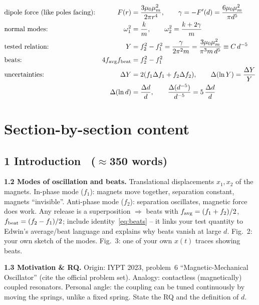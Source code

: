 \documentclass[11pt,a4paper]{article}
\newcommand{\Y}{Y}                       %
\newcommand{\muz}{\mu_0}
\newcommand{\mum}{\mu_m}
\newcommand{\words}[1]{~{\small\color{gray}($\approx$#1 words)}}
\begin{document}
\begin{keybox}
\begin{align}
&\text{dipole force (like poles facing):} & F(r)&=\frac{3\muz\mum^2}{2\pi r^4}, \qquad
  \gamma=-F'(d)=\frac{6\muz\mum^2}{\pi d^5} \label{eq:F}\\
&\text{normal modes:} & \omega_1^2&=\frac{k}{m},\qquad \omega_2^2=\frac{k+2\gamma}{m} \label{eq:modes}\\
&\text{tested relation:} & \Y&=f_2^2-f_1^2=\frac{\gamma}{2\pi^2 m}=\frac{3\muz\mum^2}{\pi^3 m\,d^5}\equiv C\,d^{-5} \label{eq:main}\\
&\text{beats:} & 4f_{\rm avg}f_{\rm beat}&=f_2^2-f_1^2 \label{eq:beats}\\
&\text{uncertainties:} & \Delta\Y&=2(f_1\Delta f_1+f_2\Delta f_2),\qquad
  \Delta(\ln\Y)=\frac{\Delta\Y}{\Y} \label{eq:unc}\\
& & \Delta(\ln d)&=\frac{\Delta d}{d},\qquad
  \frac{\Delta(d^{-5})}{d^{-5}}=5\,\frac{\Delta d}{d} \notag
\end{align}
\end{keybox}

\section{Section-by-section content}

\subsection*{1 Introduction \words{350}}
\textbf{1.2 Modes of oscillation and beats.} Translational displacements $x_1,x_2$ of the
magnets. In-phase mode ($f_1$): magnets move together, separation constant, magnets
``invisible''. Anti-phase mode ($f_2$): separation oscillates, magnetic force does work. Any
release is a superposition $\Rightarrow$ beats with $f_{\rm avg}=(f_1+f_2)/2$,
$f_{\rm beat}=(f_2-f_1)/2$; include identity~\eqref{eq:beats} -- it links your test quantity
to Edwin's average/beat language and explains why beats vanish at large $d$. Fig.~2: your own
sketch of the modes. Fig.~3: one of your own $x(t)$ traces showing beats.

\textbf{1.3 Motivation \& RQ.} Origin: IYPT 2023, problem~6 ``Magnetic-Mechanical
Oscillator'' (cite the official problem set). Analogy: contactless (magnetically) coupled
resonators. Personal angle: the coupling can be tuned continuously by moving the springs,
unlike a fixed spring. State the RQ and the definition of $d$.
\end{document}
